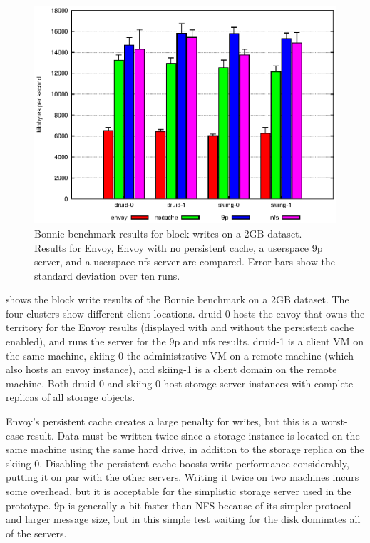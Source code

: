 \begin{figure}[t]
\centering
\includegraphics[width=\figwidth]{figures/bonnie-write}
\caption[Bonnie benchmark results for block writes]{Bonnie benchmark results for block writes on a 2GB dataset. Results for Envoy, Envoy with no persistent cache, a userspace 9p server, and a userspace nfs server are compared. Error bars show the standard deviation over ten runs.}
\label{fig:bonnie-write}
\end{figure}

 shows the block write results of the Bonnie benchmark on a 2GB dataset. The four clusters show different client locations. druid-0 hosts the envoy that owns the territory for the Envoy results (displayed with and without the persistent cache enabled), and runs the server for the 9p and nfs results. druid-1 is a client VM on the same machine, skiing-0 the administrative VM on a remote machine (which also hosts an envoy instance), and skiing-1 is a client domain on the remote machine. Both druid-0 and skiing-0 host storage server instances with complete replicas of all storage objects.

Envoy's persistent cache creates a large penalty for writes, but this is a worst-case result. Data must be written twice since a storage instance is located on the same machine using the same hard drive, in addition to the storage replica on the skiing-0. Disabling the persistent cache boosts write performance considerably, putting it on par with the other servers. Writing it twice on two machines incurs some overhead, but it is acceptable for the simplistic storage server used in the prototype. 9p is generally a bit faster than NFS because of its simpler protocol and larger message size, but in this simple test waiting for the disk dominates all of the servers.

